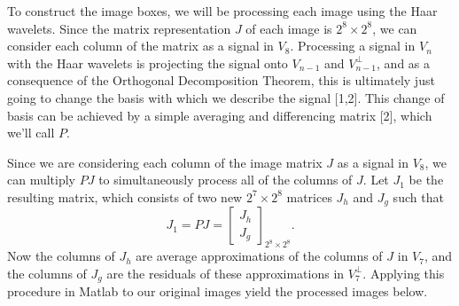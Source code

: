 \documentclass[11 pt]{article}
\begin{document}
\indent To construct the image boxes, we will be processing each image using the Haar wavelets. Since the matrix representation $J$ of each image is $2^8\times 2^8$, we can consider each column of the matrix as a signal in $V_8$. Processing a signal in $V_n$ with the Haar wavelets is projecting the signal onto $V_{n-1}$ and $V_{n-1}^\perp$, and as a consequence of the Orthogonal Decomposition Theorem, this is ultimately just going to change the basis with which we describe the signal [1,2]. This change of basis can be achieved by a simple averaging and differencing matrix [2], which we'll call $P$.

Since we are considering each column of the image matrix $J$ as a signal in $V_8$, we can multiply $PJ$ to simultaneously process all of the columns of $J$. Let $J_1$ be the resulting matrix, which consists of two new $2^7\times 2^8$ matrices $J_h$ and $J_g$ such that $$J_1=PJ=\begin{bmatrix}J_h\\J_g\end{bmatrix}_{2^8 \times 2^8}.$$ Now the columns of $J_h$ are average approximations of the columns of $J$ in $V_7$, and the columns of $J_g$ are the residuals of these approximations in $V_7^\perp$. Applying this procedure in Matlab to our original images yield the processed images below.
\end{document}
